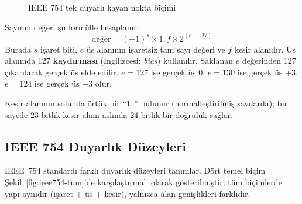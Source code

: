 \begin{figure}[H]
\centering
{}
\caption{IEEE 754 tek duyarlı kayan nokta biçimi}
\label{fig:ieee754-tek}
\end{figure}

Sayının değeri şu formülle hesaplanır:
\begin{equation}
\text{değer} = (-1)^s \times 1{,}f \times 2^{(e - 127)}
\label{eq:ieee754}
\end{equation}
Burada $s$ işaret biti, $e$ üs alanının işaretsiz tam sayı değeri ve $f$ kesir alanıdır. Üs alanında 127 \textbf{kaydırması} (İngilizcesi: \textit{bias}) kullanılır. Saklanan $e$ değerinden 127 çıkarılarak gerçek üs elde edilir. $e = 127$ ise gerçek üs $0$, $e = 130$ ise gerçek üs $+3$, $e = 124$ ise gerçek üs $-3$ olur.

Kesir alanının solunda örtük bir ``$1,$'' bulunur (normalleştirilmiş sayılarda); bu sayede 23 bitlik kesir alanı aslında 24 bitlik bir doğruluk sağlar.

\subsection{IEEE 754 Duyarlık Düzeyleri}
\label{sec:ekA-ieee754-duzeyler}

IEEE~754 standardı farklı duyarlık düzeyleri tanımlar. Dört temel biçim Şekil~\ref{fig:ieee754-tum}'de karşılaştırmalı olarak gösterilmiştir; tüm biçimlerde yapı aynıdır (işaret $+$ üs $+$ kesir), yalnızca alan genişlikleri farklıdır.

